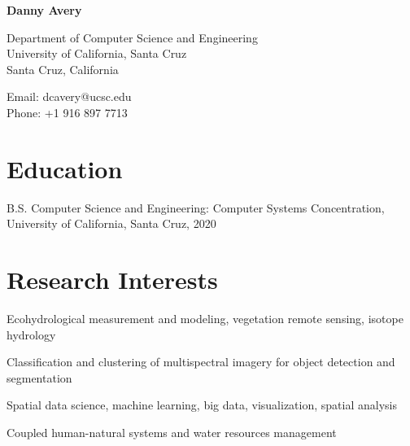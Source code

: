\documentclass[12pt,letterpaper]{report}
\newcommand{\myname}{Danny Avery}
\newcommand{\namefont}[1]{{\normalfont\bfseries\Huge{#1}}}
\newcommand{\listitemspace}{0.15em}
\renewenvironment{itemize}
{\begin{list}{}{\setlength{\leftmargin}{0em}
			\setlength{\parskip}{0em}
			\setlength{\itemsep}{\listitemspace}
			\setlength{\parsep}{\listitemspace}}}
	{\end{list}}
\begin{document}
	\raggedright
	
	\namefont{\myname}
	
	\vspace{1em}
	\begin{minipage}[t]{0.495\textwidth}
		Department of Computer Science and Engineering \\
		University of California, Santa Cruz \\
		Santa Cruz, California
	\end{minipage}
	\begin{minipage}[t]{0.495\textwidth}
		Email: dcavery@ucsc.edu \\
		Phone: +1 916 897 7713
	\end{minipage}
	\vspace{0.5em}
	
	
	
	\section*{Education}
	
	\begin{tablist}
		
		\item[B.S.]  \tab Computer Science and Engineering: Computer Systems Concentration, University of California, Santa Cruz, 2020
		
	\end{tablist}	


	
	\section*{Research Interests}
	
	\begin{itemize}
		
		\item Ecohydrological measurement and modeling, vegetation remote sensing, isotope hydrology
		
		\item Classification and clustering of multispectral imagery for object detection and segmentation
		
		\item Spatial data science, machine learning, big data, visualization, spatial analysis
		
		\item Coupled human-natural systems and water resources management 
		
	\end{itemize}
	
\end{document}
